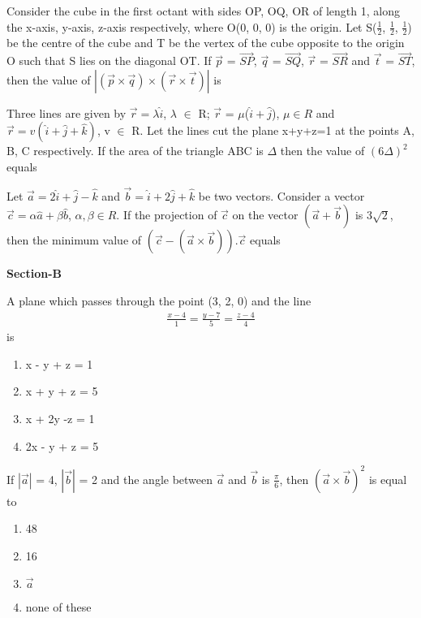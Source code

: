 \item Consider the cube in the first octant with sides OP, OQ, OR of length 1, along the x-axis, y-axis, z-axis respectively, where O(0, 0, 0) is the origin. Let S($\frac{1}{2}$, $\frac{1}{2}$, $\frac{1}{2}$) be the centre of the cube and T be the vertex of the cube opposite to the origin O such that S lies on the diagonal OT. If 
$\overrightarrow{p}$ = $\overrightarrow{SP}$, $\overrightarrow{q}$ = $\overrightarrow{SQ}$, $\overrightarrow{r}$ = $\overrightarrow{SR}$ and $\overrightarrow{t}$ = $\overrightarrow{ST}$, then the value of $|(\overrightarrow{p} \times \overrightarrow{q}) \times (\overrightarrow{r} \times \overrightarrow{t})|$ is

\item Three lines are given by $\overrightarrow{r} = \lambda\hat{i}$, $\lambda$ $\in$ R; $\overrightarrow{r}$ = $\mu$($\hat{i} + \hat{j}$), $\mu \in R$ and $\overrightarrow{r} = v(\hat{i}+\hat{j}+\hat{k})$, v $\in$ R. Let the lines cut the plane x+y+z=1 at the points A, B, C respectively. If the area of the triangle ABC is $\Delta$ then the value of $(6\Delta)^{2}$ equals

\item Let $\overrightarrow{a} = 2\hat{i} + \hat{j} - \hat{k}$ and $\overrightarrow{b} = \hat{i} + 2\hat{j} + \hat{k}$ be two vectors. Consider a vector $\overrightarrow{c} = \alpha\hat{a} + \beta\hat{b}$, $\alpha, \beta \in R$. If the projection of $\overrightarrow{c}$ on the vector $(\overrightarrow{a} + \overrightarrow{b})$ is 3$\sqrt{2}$, then the minimum value of $(\overrightarrow{c}-(\overrightarrow{a} \times \overrightarrow{b})).\overrightarrow{c}$ equals

\textbf{Section-B}

\item A plane which passes through the point (3, 2, 0) and the line
\begin{align*}
\frac{x-4}{1} = \frac{y-7}{5} = \frac{z-4}{4}
\end{align*}
is
\begin{enumerate}
\item x - y + z = 1
\item x + y + z = 5
\item x + 2y -z = 1
\item 2x - y + z = 5
\end{enumerate}

\item If $|\overrightarrow{a}|$ = 4, $|\overrightarrow{b}|$ = 2 and the angle between $\overrightarrow{a}$ and $\overrightarrow{b}$ is $\frac{\pi}{6}$, then $(\overrightarrow{a} \times \overrightarrow{b})^{2}$ is equal to
\begin{enumerate}
\item 48
\item 16
\item $\overrightarrow{a}$
\item none of these
\end{enumerate}

